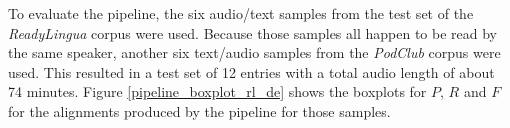 

To evaluate the pipeline, the six audio/text samples from the test set of the \textit{ReadyLingua} corpus were used. Because those samples all happen to be read by the same speaker, another six text/audio samples from the \textit{PodClub} corpus were used. This resulted in a test set of 12 entries with a total audio length of about 74 minutes. Figure \ref{pipeline_boxplot_rl_de} shows the boxplots for $P$, $R$ and $F$ for the alignments produced by the pipeline for those samples.

